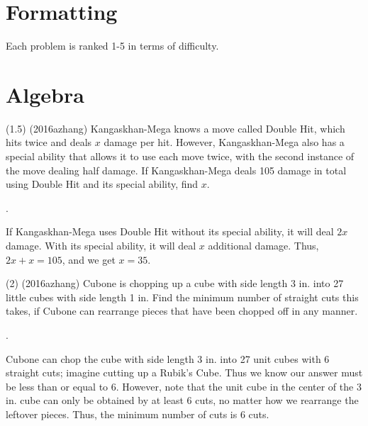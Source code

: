 \documentclass{article}
\begin{document}
\maketitle
\section{Formatting}
Each problem is ranked 1-5 in terms of difficulty.

\section{Algebra}
\begin{problem}
(1.5) (2016azhang) Kangaskhan-Mega knows a move called Double Hit, which hits twice and deals $x$ damage per hit. However, Kangaskhan-Mega also has a special ability that allows it to use each move twice, with the second instance of the move dealing half damage. If Kangaskhan-Mega deals 105 damage in total using Double Hit and its special ability, find $x$.
\end{problem}

\begin{answer}
.
\end{answer}

\begin{solution}
If Kangaskhan-Mega uses Double Hit without its special ability, it will deal $2x$ damage. With its special ability, it will deal $x$ additional damage. Thus, $2x + x = 105$, and we get $x = 35$.
\end{solution}

\begin{problem}
(2) (2016azhang) Cubone is chopping up a cube with side length 3 in. into 27 little cubes with side length 1 in. Find the minimum number of straight cuts this takes, if Cubone can rearrange pieces that have been chopped off in any manner.
\end{problem}

\begin{answer}
.
\end{answer}

\begin{solution}
Cubone can chop the cube with side length 3 in. into 27 unit cubes with 6 straight cuts; imagine cutting up a Rubik's Cube. Thus we know our answer must be less than or equal to 6. However, note that the unit cube in the center of the 3 in. cube can only be obtained by at least 6 cuts, no matter how we rearrange the leftover pieces. Thus, the minimum number of cuts is 6 cuts.
\end{solution}
\end{document}
